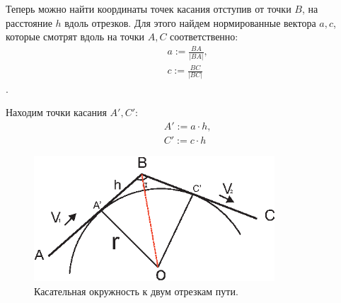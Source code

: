 \documentclass[a4paper,12pt]{article}
\begin{document}
Теперь можно найти координаты точек касания отступив от точки $B$, на расстояние $h$ вдоль отрезков. Для этого найдем нормированные вектора $a,c$, которые смотрят вдоль  на точки $A,  C $ соответственно: 
\begin{align*}
    &a:=\frac{BA}{|BA|},\\
    &c:=\frac{BC}{|BC|}
\end{align*}
.

Находим точки касания $A',C'$:
\begin{align*}
    &A' := a \cdot h, \\
    &C' := c \cdot h
\end{align*}
\newpage

\begin{figure}[ht!]
\centering
\includegraphics[width=90mm]{tochki_kasania.eps}
\caption{Касательная окружность к двум отрезкам пути.}\label{two_lines_and_circle_2}
\end{figure}
\end{document}
